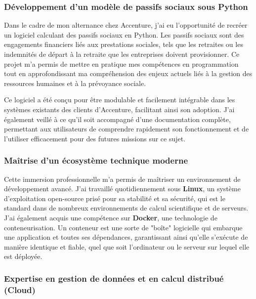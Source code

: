 \subsubsection{Développement d'un modèle de passifs sociaux sous Python}

Dans le cadre de mon alternance chez Accenture, j'ai eu l'opportunité de recréer un logiciel calculant des passifs sociaux en Python. Les passifs sociaux sont des engagements financiers liés aux prestations sociales, tels que les retraites ou les indemnités de départ à la retraite que les entreprises doivent provisionner. Ce projet m'a permis de mettre en pratique mes compétences en programmation tout en approfondissant ma compréhension des enjeux actuels liés à la gestion des ressources humaines et à la prévoyance sociale.

Ce logiciel a été conçu pour être modulable et facilement intégrable dans les systèmes existants des clients d'Accenture, facilitant ainsi son adoption. J'ai également veillé à ce qu'il soit accompagné d'une documentation complète, permettant aux utilisateurs de comprendre rapidement son fonctionnement et de l'utiliser efficacement pour des futures missions sur ce sujet.

\subsubsection{Maîtrise d'un écosystème technique moderne}

Cette immersion professionnelle m'a permis de maîtriser un environnement de développement avancé. J'ai travaillé quotidiennement sous \textbf{Linux}, un système d'exploitation open-source prisé pour sa stabilité et sa sécurité, qui est le standard dans de nombreux environnements de calcul scientifique et de serveurs. J'ai également acquis une compétence sur \textbf{Docker}, une technologie de conteneurisation. Un conteneur est une sorte de "boîte" logicielle qui embarque une application et toutes ses dépendances, garantissant ainsi qu'elle s'exécute de manière identique et fiable, quel que soit l'ordinateur ou le serveur sur lequel elle est déployée.



\subsubsection{Expertise en gestion de données et en calcul distribué (Cloud)}

